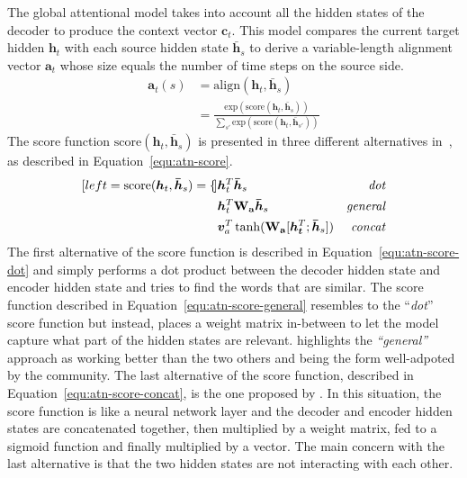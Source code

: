  The global attentional model takes into account all the hidden states of the decoder to produce the context vector $\bm{c}_t$. This model compares the current target hidden $\bm{h}_t$ with each source hidden state $\bm{\bar{h}}_s$ to derive a variable-length alignment vector $\bm{a}_t$ whose size equals the number of time steps on the source side.
 \begin{align}
    \bm{a}_t(s) &= \mathrm{align}(\bm{h}_t, \bm{\bar{h}}_s)\\
    \label{equ:atn-a_t}
    &= \frac{\mathrm{exp}(\mathrm{score}(\bm{h}_t, \bm{\bar{h}}_s))}{\sum_{s'} \mathrm{exp}(\mathrm{score}(\bm{h}_t, \bm{\bar{h}}_{s'}))}
 \end{align}
The score function $\mathrm{score}(\bm{h}_t, \bm{\bar{h}}_s)$ is presented in three different alternatives in~\citet{1508.04025}, as described in Equation~\ref{equ:atn-score}.
\begin{subequations}
    \label{equ:atn-score}
    \begin{align}[left ={\mathrm{score}(\bm{h}_t, \bm{\bar{h}}_s) = \empheqlbrace}]
        & \bm{h}_t^T \bm{\bar{h}}_s & \mathit{dot} \label{equ:atn-score-dot}\\
        & \bm{h}_t^T \mathbf{W_a} \bm{\bar{h}}_s & \mathit{general} \label{equ:atn-score-general}\\
        & \bm{v}_a^T \tanh ( \mathbf{W_a} [\bm{h_t}^T;\bm{\bar{h}}_s]) & \mathit{concat} \label{equ:atn-score-concat}
    \end{align}
\end{subequations}
The first alternative of the score function is described in Equation~\ref{equ:atn-score-dot} and simply performs a dot product between the decoder hidden state and encoder hidden state and tries to find the words that are similar.
The score function described in Equation~\ref{equ:atn-score-general} resembles to the ``\textit{dot}'' score function but instead, places a weight matrix in-between to let the model capture what part of the hidden states are relevant. \citet{youtube-nmt-attention} highlights the \textit{``general''} approach as working better than the two others and being the form well-adpoted by the community.
The last alternative of the score function, described in Equation~\ref{equ:atn-score-concat}, is the one proposed by \citet{1409.0473}. In this situation, the score function is like a neural network layer and the decoder and encoder hidden states are concatenated together, then multiplied by a weight matrix, fed to a sigmoid function and finally multiplied by a vector. The main concern with the last alternative is that the two hidden states are not interacting with each other.
